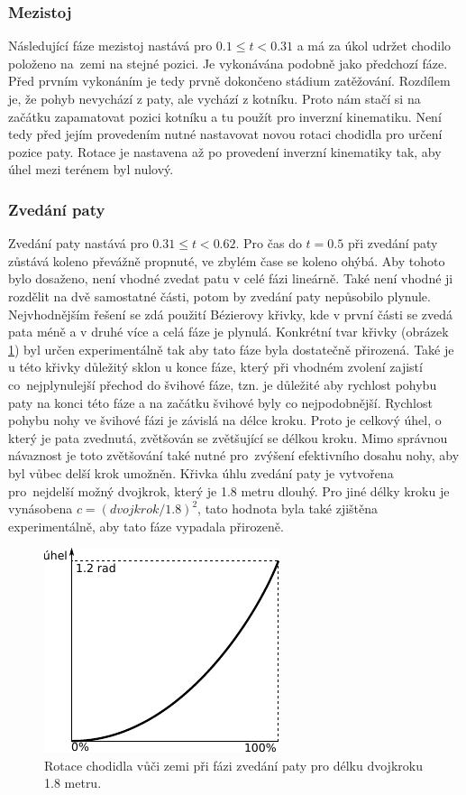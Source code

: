 \subsubsection{Mezistoj}
Následující fáze mezistoj nastává pro $0.1 \leq t < 0.31$ a má za úkol udržet chodilo položeno na~zemi na stejné pozici. Je vykonávána podobně jako předchozí fáze. Před prvním vykonáním je tedy prvně dokončeno stádium zatěžování. Rozdílem je, že pohyb nevychází z paty, ale vychází z kotníku. Proto nám stačí si na začátku zapamatovat pozici kotníku a tu použít pro inverzní kinematiku. Není tedy před jejím provedením nutné nastavovat novou rotaci chodidla pro určení pozice paty. Rotace je nastavena až po provedení inverzní kinematiky tak, aby úhel mezi terénem byl nulový.

\subsubsection{Zvedání paty}
Zvedání paty nastává pro $0.31 \leq t < 0.62$. Pro čas do $t = 0.5$ při zvedání paty zůstává koleno převážně propnuté, ve zbylém čase se koleno ohýbá. Aby tohoto bylo dosaženo, není vhodné zvedat patu v celé fázi lineárně. Také není vhodné ji rozdělit na dvě samostatné části, potom by zvedání paty nepůsobilo plynule. Nejvhodnějším řešení se zdá použití Bézierovy křivky, kde v první části se zvedá pata méně a v druhé více a celá fáze je plynulá. Konkrétní tvar křivky (obrázek \ref{fig:heelRiseRot}) byl určen experimentálně tak aby tato fáze byla dostatečně přirozená. Také je u této křivky důležitý sklon u konce fáze, který při vhodném zvolení zajistí co~nejplynulejší přechod do švihové fáze, tzn. je důležité aby rychlost pohybu paty na konci této fáze a na začátku švihové byly co nejpodobnější. Rychlost pohybu nohy ve švihové fázi je závislá na délce kroku. Proto je celkový úhel, o který je pata zvednutá, zvětšován se zvětšující se délkou kroku. Mimo správnou návaznost je toto zvětšování také nutné pro~zvýšení efektivního dosahu nohy, aby byl vůbec delší krok umožněn. Křivka úhlu zvedání paty je vytvořena pro~nejdelší možný dvojkrok, který je 1.8 metru dlouhý. Pro jiné délky kroku je vynásobena $c = (dvojkrok/1.8)^2$, tato hodnota byla také zjištěna experimentálně, aby tato fáze vypadala přirozeně.

\begin{figure}[h]
	\centering
	\includegraphics[width=0.3\linewidth]{fig/heelRiseRot.pdf}
	\caption{Rotace  chodidla vůči zemi při fázi zvedání paty pro délku dvojkroku 1.8 metru.}
	\label{fig:heelRiseRot}
\end{figure}

